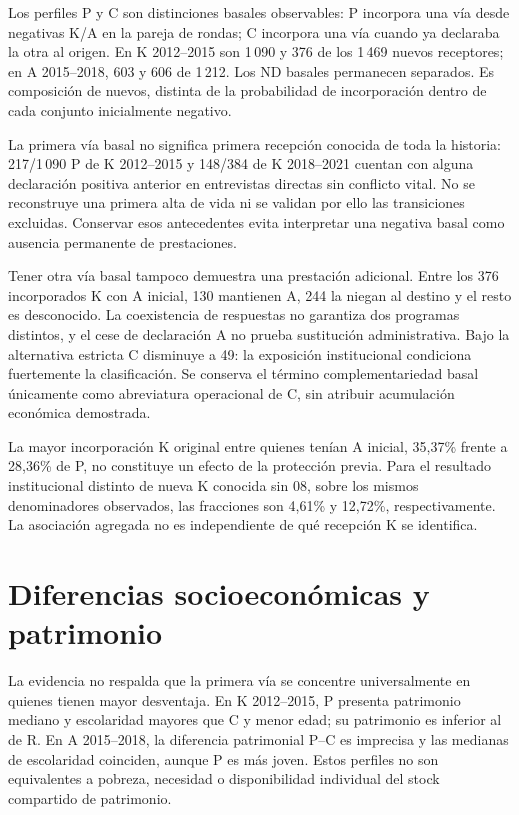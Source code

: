 Los perfiles P y C son distinciones basales observables: P incorpora una vía
desde negativas K/A en la pareja de rondas; C incorpora una vía cuando ya
declaraba la otra al origen. En K 2012--2015 son 1\,090 y 376 de los 1\,469
nuevos receptores; en A 2015--2018, 603 y 606 de 1\,212. Los ND basales
permanecen separados. Es composición de nuevos, distinta de la probabilidad
de incorporación dentro de cada conjunto inicialmente negativo.

La primera vía basal no significa primera recepción conocida de toda la
historia: 217/1\,090 P de K 2012--2015 y 148/384 de K 2018--2021 cuentan con
alguna declaración positiva anterior en entrevistas directas sin conflicto
vital. No se reconstruye una primera alta de vida ni se validan por ello las
transiciones excluidas. Conservar esos antecedentes evita interpretar una
negativa basal como ausencia permanente de prestaciones.

Tener otra vía basal tampoco demuestra una prestación adicional. Entre los
376 incorporados K con A inicial, 130 mantienen A, 244 la niegan al destino
y el resto es desconocido. La coexistencia de respuestas no garantiza dos
programas distintos, y el cese de declaración A no prueba sustitución
administrativa. Bajo la alternativa estricta C disminuye a 49: la exposición
institucional condiciona fuertemente la clasificación. Se conserva el término
complementariedad basal únicamente como abreviatura operacional de C, sin
atribuir acumulación económica demostrada.

La mayor incorporación K original entre quienes tenían A inicial, 35{,}37\%
frente a 28{,}36\% de P, no constituye un efecto de la protección previa.
Para el resultado institucional distinto de nueva K conocida sin 08, sobre
los mismos denominadores observados, las fracciones son 4{,}61\% y
12{,}72\%, respectivamente. La asociación agregada no es independiente
de qué recepción K se identifica.

\section{Diferencias socioeconómicas y patrimonio}

La evidencia no respalda que la primera vía se concentre universalmente en
quienes tienen mayor desventaja. En K 2012--2015, P presenta patrimonio
mediano y escolaridad mayores que C y menor edad; su patrimonio es inferior
al de R. En A 2015--2018, la diferencia patrimonial P--C es imprecisa y las
medianas de escolaridad coinciden, aunque P es más joven. Estos perfiles no
son equivalentes a pobreza, necesidad o disponibilidad individual del stock
compartido de patrimonio.

